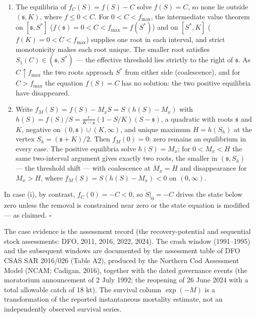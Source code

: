\documentclass[11pt]{article}
\begin{document}
\begin{enumerate}
\def\labelenumi{(\roman{enumi})}
\item
  The equilibria of \(f_C(S) = f(S) - C\) solve \(f(S) = C\), so none
  lie outside \((\mathfrak s,K)\), where \(f \le 0 < C\). For
  \(0 < C < f_{\max}\), the intermediate value theorem on
  \([\mathfrak s, S^*]\)
  (\(f(\mathfrak s) = 0 < C < f_{\max} = f(S^*)\)) and on \([S^*, K]\)
  (\(f(K) = 0 < C < f_{\max}\)) supplies one root in each interval, and
  strict monotonicity makes each root unique. The smaller root satisfies
  \(S_1(C) \in (\mathfrak s, S^*)\) --- the effective threshold lies
  strictly to the right of \(\mathfrak s\). As \(C \uparrow f_{\max}\)
  the two roots approach \(S^*\) from either side (coalescence), and for
  \(C > f_{\max}\) the equation \(f(S) = C\) has no solution: the two
  positive equilibria have disappeared.
\item
  Write \(f_M(S) = f(S) - M_x S = S\, (h(S) - M_x)\) with
  \(h(S) = f(S)/S = \frac{r}{K-\mathfrak s}(1-S/K)(S-\mathfrak s)\), a
  quadratic with roots \(\mathfrak s\) and \(K\), negative on
  \((0,\mathfrak s)\cup(K,\infty)\), and unique maximum \(H = h(S_h)\)
  at the vertex \(S_h = (\mathfrak s+K)/2\). Then \(f_M(0) = 0\): zero
  remains an equilibrium in every case. The positive equilibria solve
  \(h(S) = M_x\); for \(0 < M_x < H\) the same two-interval argument
  gives exactly two roots, the smaller in \((\mathfrak s, S_h)\) --- the
  threshold shift --- with coalescence at \(M_x = H\) and disappearance
  for \(M_x > H\), where \(f_M(S) = S(h(S)-M_x) < 0\) on \((0,\infty)\).
\end{enumerate}

In case (i), by contrast, \(f_C(0) = -C < 0\), so \(\dot S|_0 = -C\)
drives the state below zero unless the removal is constrained near zero
or the state equation is modified --- as claimed. \ensuremath{\square}

The case evidence is the assessment record (the recovery-potential and
sequential stock assessments: DFO, 2011, 2016, 2022, 2024). The crash
window (1991--1995) and the subsequent windows are documented by the
assessment table of DFO CSAS SAR 2016/026 (Table A2), produced by the
Northern Cod Assessment Model (NCAM; Cadigan, 2016), together with the
dated governance events (the moratorium announcement of 2 July 1992; the
reopening of 26 June 2024 with a total allowable catch of 18 kt). The
survival column \(\exp(-M)\) is a transformation of the reported
instantaneous mortality estimate, not an independently observed survival
series.
\end{document}
